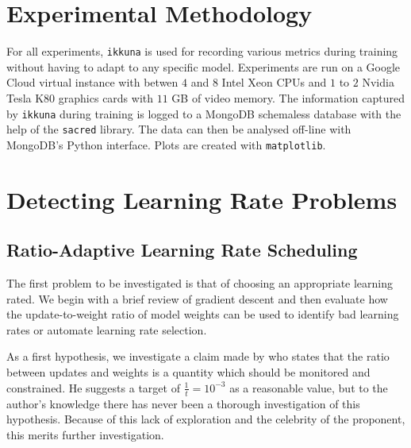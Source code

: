 \section{Experimental Methodology}%
\label{sec:experimental_methodology}

For all experiments, \texttt{ikkuna} is used for recording various metrics
during training without having to adapt to any specific model. Experiments are
run on a Google Cloud virtual instance with betwen $4$ and $8$ Intel Xeon CPUs
and $1$ to $2$  Nvidia Tesla K80 graphics cards with $11$ GB of video memory. The
information captured by \texttt{ikkuna} during training is logged to a MongoDB
schemaless database with the help of the \texttt{sacred} library. The data can
then be analysed off-line with MongoDB's Python interface. Plots are created
with \texttt{matplotlib}. %

\section{Detecting Learning Rate Problems}%
\label{sec:detecting_learning_rate_problems}

\subsection{Ratio-Adaptive Learning Rate Scheduling}%
\label{sub:ratio_adaptive_learning_rate_scheduling}

The first problem to be investigated is that of choosing an appropriate learning
rated. We begin with a brief review of gradient descent and then evaluate how
the update-to-weight ratio of model weights can be used to identify bad learning
rates or automate learning rate selection.

As a first hypothesis, we investigate a claim made by \citet{karpathycs231n} who
states that the ratio between updates and weights is a quantity which should be
monitored and constrained. He suggests a target of $\frac{1}{t} = 10^{-3}$ as a
reasonable value, but to the author's knowledge there has never been a thorough
investigation of this hypothesis. Because of this lack of exploration and the
celebrity of the proponent, this merits further investigation.

